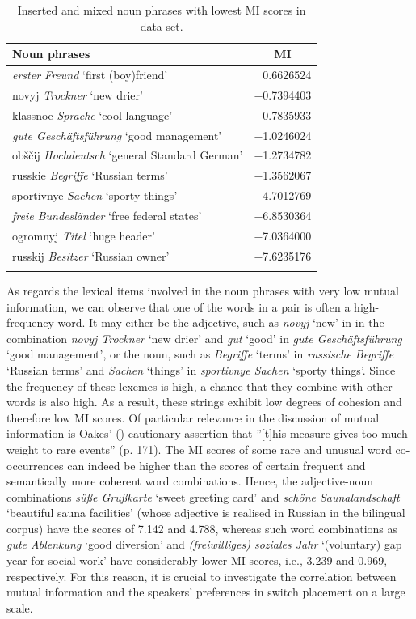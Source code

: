 \begin{table}
		\begin{tabular}{lr}
		    \lsptoprule
			Noun phrases	& \multicolumn{1}{c}{MI} \\ \midrule
			\textit{erster Freund}	`first (boy)friend' &0.6626524\\
			novyj \textit{Trockner} `new drier'		&−0.7394403\\
			klassnoe \textit{Sprache} `cool language' 	&−0.7835933\\
			\textit{gute Geschäftsführung} `good management'	&−1.0246024\\
			obščij \textit{Hochdeutsch}	 `general Standard German'	&−1.2734782\\
			russkie \textit{Begriffe} `Russian terms'	&−1.3562067\\
			sportivnye \textit{Sachen} `sporty things'	&−4.7012769\\
			\textit{freie Bundesländer} `free federal states' &−6.8530364\\
			ogromnyj \textit{Titel}	 `huge header'	&−7.0364000\\
			russkij \textit{Besitzer} `Russian owner'	&−7.6235176\\
			\lspbottomrule 
		\end{tabular}
\caption{Inserted and mixed noun phrases with lowest MI scores in data set.\label{tab:4:10}}
\end{table}

As regards the lexical items involved in the noun phrases with very low mutual information, we can observe that one of the words in a pair is often a high-frequency word. It may either be the adjective, such as \textit{novyj} `new' in in the combination \textit{novyj Trockner} `new drier' and \textit{gut} `good' in \textit{gute Geschäftsführung} `good management', or the noun, such as \textit{Begriffe} `terms' in \textit{russische Begriffe} `Russian terms' and \textit{Sachen} `things' in \textit{sportivnye Sachen} `sporty things'. Since the frequency of these lexemes is high, a chance that they combine with other words is also high. As a result, these strings exhibit low degrees of cohesion and therefore low MI scores. Of particular relevance in the discussion of mutual information is Oakes' (\citeyear{oakes-1998}) cautionary assertion that ''[t]his measure gives too much weight to rare events'' (p. 171). The MI scores of some rare and unusual word co-occurrences can indeed be higher than the scores of certain frequent and semantically more coherent word combinations. Hence, the adjective-noun combinations \textit{süße Grußkarte} `sweet greeting card' and \textit{schöne Saunalandschaft} `beautiful sauna facilities' (whose adjective is realised in Russian in the bilingual corpus) have the scores of 7.142 and 4.788, whereas such word combinations as \textit{gute Ablenkung} `good diversion' and \textit{(freiwilliges) soziales Jahr} `(voluntary) gap year for social work' have considerably lower MI scores, i.e., 3.239 and 0.969, respectively. For this reason, it is crucial to investigate the correlation between mutual information and the speakers' preferences in switch placement on a large scale.

